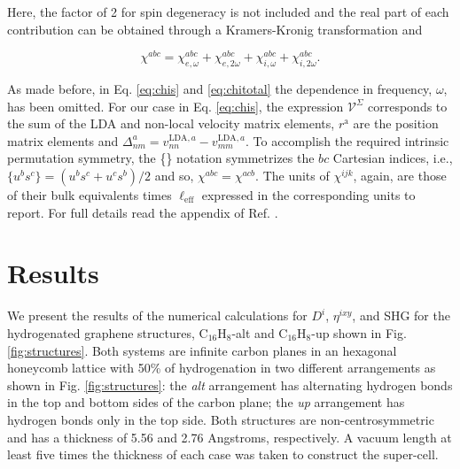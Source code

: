 \documentclass[aps,pra,11pt,tightenlines,showpacs,superscriptaddress,groupedaddress]{revtex4-1}
\newcommand{\di}{$D^{i}$}
\newcommand{\ea}{$\eta^{ixy}$}
\newcommand{\altstc}{C$_{16}$H$_{8}$-alt}
\newcommand{\upstc}{C$_{16}$H$_{8}$-up}
\begin{document}
\noindent Here, the factor of 2 for spin degeneracy is not included and the
real part of each contribution can be obtained through a Kramers-Kronig
transformation \cite{tancogne2014effect} and

\begin{equation}\label{eq:chitotal}
    \chi^{abc} = \chi^{abc}_{e,\omega} + \chi^{abc}_{e,2\omega} +
    \chi^{abc}_{i,\omega} + \chi^{abc}_{i,2\omega}
    .
\end{equation}

As made before, in Eq. \ref{eq:chis} and \ref{eq:chitotal} the dependence in
frequency, $\omega$, has been omitted. For our case in Eq. \ref{eq:chis}, the
expression $\mathcal{V}^{\Sigma}$ corresponds to the sum of the LDA and 
non-local velocity matrix elements, $r^{\mathrm{a}} $ are the position matrix
elements and $\Delta^{a}_{nm} = v^{\text{LDA},a}_{nn} - v^{\text{LDA},a}_{mm}
$. To accomplish the required intrinsic permutation symmetry, the \{\} notation
symmetrizes the $bc$ Cartesian indices, i.e., $\{u^{b}s^{c}\} = (u^{b}s^{c} +
u^{c}s^{b})/{2}$ and so, $\chi^{abc} = \chi^{acb}$. The units of $\chi^{ijk} $,
again, are those of their bulk equivalents times $\ell_{\text{eff}}$ expressed
in the corresponding units to report. For full details read the appendix of
Ref. \cite{anderson2015theory}.







\section{Results} %
\label{sec:results}

We present the results of the numerical calculations for {\di}, {\ea}, and SHG for
the hydrogenated graphene structures, {\altstc} and {\upstc} shown in Fig.
\ref{fig:structures}. Both systems are infinite carbon planes in an
hexagonal honeycomb lattice with 50\% of hydrogenation in two different
arrangements as shown in Fig. \ref{fig:structures}: the \emph{alt} arrangement has
alternating hydrogen bonds in the top and bottom sides of the carbon plane; the
\emph{up} arrangement has hydrogen bonds only in the top
side. Both structures are non-centrosymmetric and has a thickness of 5.56 and
2.76 Angstroms, respectively. A vacuum length at least  five times the
thickness of each case was taken to construct the super-cell.
\end{document}
